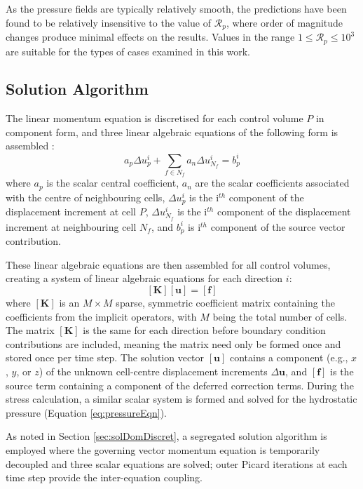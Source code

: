 \documentclass[sn-mathphys,Numbered]{sn-jnl}%
\newcommand{\bb}{\boldsymbol}
\begin{document}
As the pressure fields are typically relatively smooth, the predictions have been found to be relatively insensitive to the value of $\mathcal{R}_p$, where order of magnitude changes produce minimal effects on the results.
Values in the range $1 \leq \mathcal{R}_p \leq 10^3$ are suitable for the types of cases examined in this work.


\subsection{Solution Algorithm}
The linear momentum equation is discretised for each control volume $P$ in component form, and three linear algebraic equations of the following form is assembled \cite{jasak_application_2000}:
\begin{equation}
a_p \Delta {u}_p^i + \sum_{f \in N_f}  a_n \Delta {u}_{N_f}^i = {b}_p^i
\end{equation}
where $a_{p}$ is the scalar central coefficient, $a_{n}$ are the scalar coefficients associated with the centre of neighbouring cells, $\Delta {u}_p^i$ is the i$^{th}$ component of the displacement increment at cell $P$, $\Delta {u}_{N_f}^i$ is the i$^{th}$ component of the displacement increment at neighbouring cell $N_f$, and ${b}_p^i$ is i$^{th}$ component of the source vector contribution.

These linear algebraic equations are then assembled for all control volumes, creating a system of linear algebraic equations for each direction $i$:
\begin{equation}
    \left[\bb{K}\right]
    \left[\bb{u}\right] =
    \left[ \bb{f} \right]
\end{equation}
where $\left[\bb{K}\right]$ is an $M \times M$ sparse, symmetric coefficient matrix containing the coefficients from the implicit operators, with $M$ being the total number of cells.
The matrix $\left[\bb{K}\right]$ is the same for each direction before boundary condition contributions are included, meaning the matrix need only be formed once and stored once per time step.
The solution vector $\left[\bb{u}\right]$ contains a component (e.g., $x$, $y$, or $z$) of the unknown cell-centre displacement increments $\Delta\bb{ u}$, and $\left[\bb{f}\right]$ is the source term containing a component of the deferred correction terms.
During the stress calculation, a similar scalar system is formed and solved for the hydrostatic pressure (Equation \ref{eq:pressureEqn}).

As noted in Section \ref{sec:solDomDiscret}, a segregated solution algorithm is employed where the governing vector momentum equation is temporarily decoupled and three scalar equations are solved; outer Picard iterations at each time step provide the inter-equation coupling.
\end{document}
